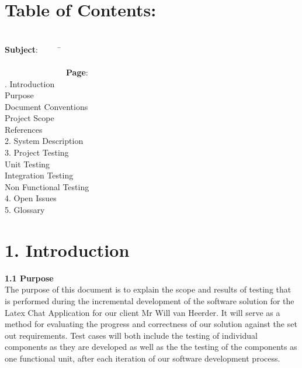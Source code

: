 \documentclass[29pt,a4paper]{moderncv}
\begin{document}
\newpage
\section{\textbf{Table of Contents:}}
\begin{tabbing}
\\\textbf{Subject}: ~~~~~\= ~~~~~~~~~~~~~~~~~~~~~~~~~~~~~~~~~~~~~~~~~~~~~~~~~~~~~~~~~~~~~~~~~~~~~~~~~~~~~~~~~~~~~~~\= \textbf{Page}:
\\. Introduction \> \\							
 Purpose 	\\							
 Document Conventions 					\\
 Project Scope 							\\
 References 							\\
2. System Description \> 					\\
3. Project Testing \> \\
 Unit Testing \\
 Integration Testing  \\
 Non Functional Testing  \\
4. Open Issues \> \\
5. Glossary \> \\
\end{tabbing}

\newpage
	\section*{\textbf{1. Introduction}}
	\vspace{4mm}
	
		\textbf{1.1 Purpose}
			\\The purpose of this document is to explain the scope and results of testing that is performed during the incremental development of the software solution for the Latex Chat Application for our client Mr Will van Heerder.  It will serve as a method for evaluating the progress and correctness of our solution against the set out requirements. Test cases will both include the testing of individual components as they are developed as well as the the testing of the components as one functional unit, after each iteration of our software development process.   \\
		\vspace{1mm}
		
\end{document}
